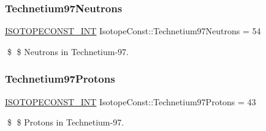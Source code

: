 \subsubsection{\texorpdfstring{Technetium97\+Neutrons}{Technetium97Neutrons}}
{\footnotesize\ttfamily \mbox{\hyperlink{group___isotope_const-_macros_ga5f18360b3e99483a35c32d789e62621c}{I\+S\+O\+T\+O\+P\+E\+C\+O\+N\+S\+T\+\_\+\+I\+NT}} Isotope\+Const\+::\+Technetium97\+Neutrons = 54}

\$ \$ Neutrons in Technetium-\/97. \mbox{\label{group___isotope_const-_technetium-_tc97_ga370dc741a60ef59fa5d3f355f717b1a1}} 
\subsubsection{\texorpdfstring{Technetium97\+Protons}{Technetium97Protons}}
{\footnotesize\ttfamily \mbox{\hyperlink{group___isotope_const-_macros_ga5f18360b3e99483a35c32d789e62621c}{I\+S\+O\+T\+O\+P\+E\+C\+O\+N\+S\+T\+\_\+\+I\+NT}} Isotope\+Const\+::\+Technetium97\+Protons = 43}

\$ \$ Protons in Technetium-\/97. 
